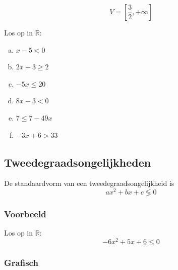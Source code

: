 \documentclass[12pt,twoside,a4paper]{article}
\begin{document}
\[V=[\dfrac{3}{2}, +\infty]\]

\begin{oefening}
Los op in $\mathbb{R}$:
\begin{multicols}{2}
  \begin{enumerate}[(a)]
    \itemsep0.6em
  \item $x-5 < 0$
  \item $2x+3 \geq 2$
  \item $-5x \leq 20$
  \item $8x-3 < 0$
  \item $7 \leq 7-49x$
  \item $-3x+6 > 33$
  \end{enumerate}
\end{multicols}
\end{oefening}

\subsection{Tweedegraadsongelijkheden}

De standaardvorm van een tweedegraadsongelijkheid is
\[ax^2 + bx + c \lessgtr 0\]

\subsubsection*{Voorbeeld}

Los  op in $\mathbb{R}$: \[ -6x^2 + 5x + 6 \leq 0 \]

\subsubsection*{Grafisch}
\end{document}
